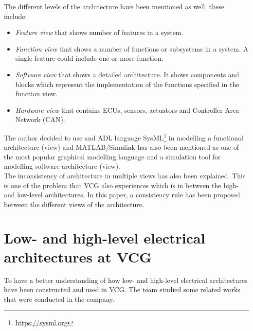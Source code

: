 The different levels of the architecture have been mentioned as well, these include:
\begin{itemize}
    \item \textit{Feature view} that shows number of features in a system.
    \item \textit{Function view} that shows a number of functions or subsystems in a system. A single feature could include one or more function.
    \item \textit{Software view} that shows a detailed architecture. It shows components and blocks which represent the implementation of the functions specified in the function view.
    \item \textit{Hardware view} that contains ECUs, sensors, actuators and Controller Area Network (CAN).
\end{itemize}
\vspace{0.2cm}
The author decided to use and ADL language SysML\footnote{\url{https://sysml.org}} in modelling a functional architecture (view) and MATLAB/Simulink has also been mentioned as one of the most popular graphical modelling language and a simulation tool for modelling software architecture (view). \\

The inconsistency of architecture in multiple views has also been explained. This is one of the problem that VCG also experiences which is in between the high- and low-level architectures. In this paper, a consistency rule has been proposed between the different views of the architecture.\\



\section{Low- and high-level electrical architectures at VCG}
To have a better understanding of how low- and high-level electrical architectures have been constructed and used in VCG. The team studied some related works that were conducted in the company.\\

